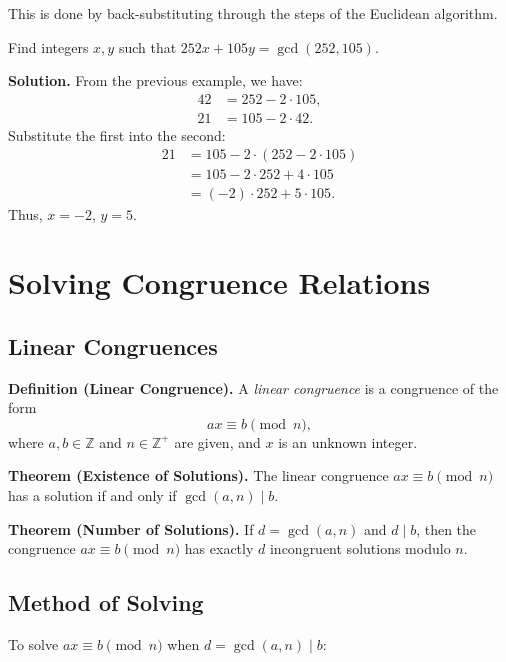 \documentclass[11pt,a4paper]{article}
\begin{document}
This is done by back-substituting through the steps of the Euclidean algorithm.

\begin{example}
Find integers $x, y$ such that $252x + 105y = \gcd(252, 105)$.

\textbf{Solution.} From the previous example, we have:
\begin{align*}
    42 &= 252 - 2 \cdot 105, \\
    21 &= 105 - 2 \cdot 42.
\end{align*}
Substitute the first into the second:
\begin{align*}
    21 &= 105 - 2 \cdot (252 - 2 \cdot 105) \\
       &= 105 - 2 \cdot 252 + 4 \cdot 105 \\
       &= (-2) \cdot 252 + 5 \cdot 105.
\end{align*}
Thus, $x = -2$, $y = 5$.
\end{example}

\section{Solving Congruence Relations}

\subsection{Linear Congruences}

\textbf{Definition (Linear Congruence).} A \textit{linear congruence} is a congruence of the form
\begin{equation*}
    ax \equiv b \pmod{n},
\end{equation*}
where $a, b \in \mathbb{Z}$ and $n \in \mathbb{Z}^+$ are given, and $x$ is an unknown integer.

\textbf{Theorem (Existence of Solutions).} The linear congruence $ax \equiv b \pmod{n}$ has a solution if and only if $\gcd(a, n) \mid b$.

\textbf{Theorem (Number of Solutions).} If $d = \gcd(a, n)$ and $d \mid b$, then the congruence $ax \equiv b \pmod{n}$ has exactly $d$ incongruent solutions modulo $n$.

\subsection{Method of Solving}

To solve $ax \equiv b \pmod{n}$ when $d = \gcd(a, n) \mid b$:
\end{document}
